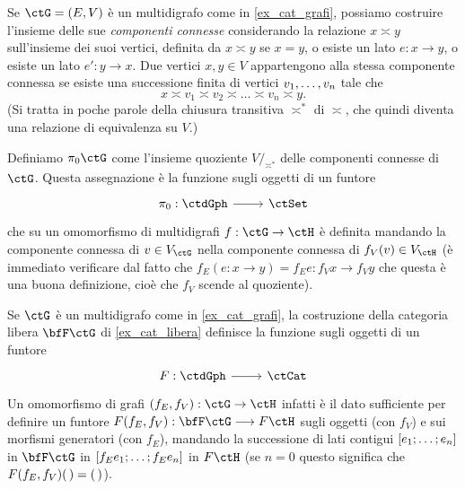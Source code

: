 \begin{example}\label{ex_fun_cpt_conn}
	Se \(\ctG=(E,V)\) è un multidigrafo come in \ref{ex_cat_grafi}, possiamo costruire l'insieme delle sue \emph{componenti connesse} considerando la relazione \(x\asymp y\) sull'insieme dei suoi vertici, definita da \(x\asymp y\) se \(x=y\), o esiste un lato \(e : x \to y\), o esiste un lato \(e' : y\to x\). Due vertici \(x,y\in V\) appartengono alla stessa componente connessa se esiste una successione finita di vertici \(\tup vn,\) tale che
	\[x \asymp v_1 \asymp v_2 \asymp\dots\asymp v_n\asymp y.\]
	(Si tratta in poche parole della chiusura transitiva \(\asymp^*\) di \(\asymp\), che quindi diventa una relazione di equivalenza su \(V\).)

	Definiamo \(\pi_0\ctG\) come l'insieme quoziente \(V/_{\asymp^*}\) delle componenti connesse di \(\ctG\). Questa assegnazione è la funzione sugli oggetti di un funtore
	\[\dmFun{\pi_0}{\ctdGph}{\ctSet}\]
	che su un omomorfismo di multidigrafi \(f : \ctG \to\ctH\) è definita mandando la componente connessa di \(v\in V_\ctG\) nella componente connessa di \(f_V(v)\in V_\ctH\) (è immediato verificare dal fatto che \(f_E(e : x\to y)=f_Ee : f_Vx\to f_Vy\) che questa è una buona definizione, cioè che \(f_V\) scende al quoziente).
\end{example}
\begin{example}
	Se \(\ctG\) è un multidigrafo come in \ref{ex_cat_grafi}, la costruzione della categoria libera \(\bfF\ctG\) di \ref{ex_cat_libera} definisce la funzione sugli oggetti di un funtore
	\[\dmFun F\ctdGph\ctCat\]
	Un omomorfismo di grafi \((f_E,f_V) : \ctG \to \ctH\) infatti è il dato sufficiente per definire un funtore \(F(f_E,f_V) : \bfF\ctG \fun F\ctH\) sugli oggetti (con \(f_V\)) e sui morfismi generatori (con \(f_E\)), mandando la successione di lati contigui \([\tup en;]\) in \(\bfF\ctG\) in \([\tup {{f_E}e}n;]\) in \(F\ctH\) (se \(n=0\) questo significa che \(F(f_E,f_V)(\,) = (\,)\)).
\end{example}
